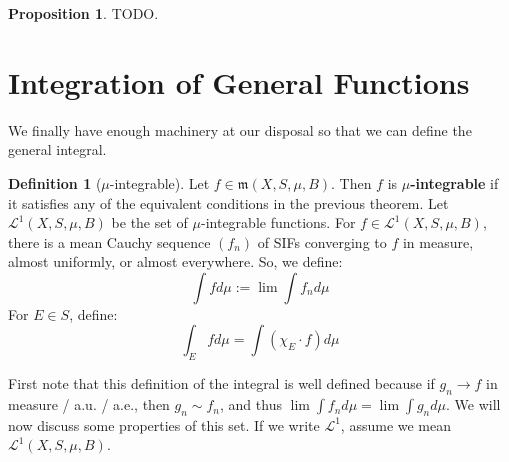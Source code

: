 \documentclass[11pt, oneside]{amsart}   	%
\theoremstyle{definition}
\newtheorem{definition}{Definition}[section]
\newtheorem{prop}{Proposition}[section]
\begin{document}
	\begin{prop}
		TODO.
	\end{prop}
	
	\section{Integration of General Functions}
	
	We finally have enough machinery at our disposal so that we can define the general integral. 
	
	\begin{definition}[$\mu$-integrable]
		Let $f\in\mathfrak m(X, S, \mu, B)$. Then $f$ is \textbf{$\mu$-integrable} if it satisfies any of the equivalent 
		conditions in the previous theorem. Let $\mathcal L^1(X, S, \mu, B)$ be the set of $\mu$-integrable functions. For 
		$f\in\mathcal L^1(X, S, \mu, B)$, there is a mean Cauchy sequence $(f_n)$ of SIFs converging to $f$ in measure, 
		almost uniformly, or almost everywhere. So, we define:
		$$
			\int fd\mu := \lim\int f_nd\mu
		$$
		For $E\in S$, define:
		$$
			\int_E fd\mu = \int (\chi_E\cdot f)d\mu
		$$
	\end{definition}
	
	First note that this definition of the integral is well defined because if $g_n\rightarrow f$ in measure / a.u. / a.e., then 
	$g_n\sim f_n$, and thus $\lim\int f_nd\mu = \lim\int g_nd\mu$. We will now discuss some properties of this set. 
	If we write $\mathcal L^1$, assume we mean $\mathcal L^1(X, S, \mu, B)$. 
	
\end{document}
